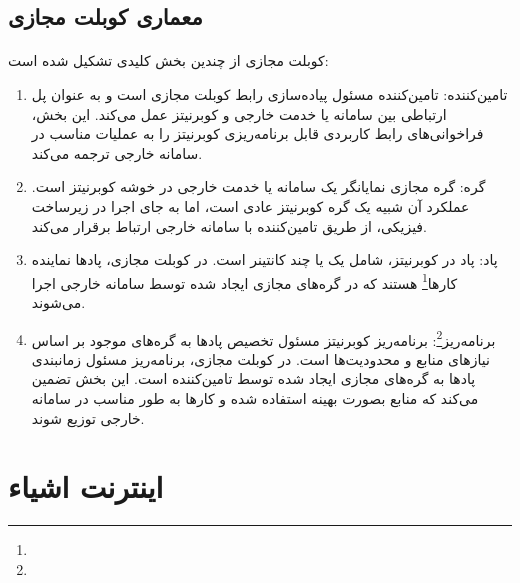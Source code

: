 \subsection{معماری کوبلت مجازی}
\label{subsec:vkube_arch}
\paragraph{}
{
    کوبلت مجازی از چندین بخش کلیدی تشکیل شده است:
    \begin{enumerate}
        \item تامین‌کننده: تامین‌کننده مسئول پیاده‌سازی رابط کوبلت مجازی است و به عنوان پل ارتباطی بین سامانه یا خدمت خارجی و کوبرنیتز عمل می‌کند. این بخش، فراخوانی‌های رابط کاربردی قابل برنامه‌ریزی کوبرنیتز را به عملیات مناسب در سامانه خارجی ترجمه می‌کند.
        \item گره: گره مجازی نمایانگر یک سامانه یا خدمت خارجی در خوشه کوبرنیتز است. عملکرد آن شبیه یک گره کوبرنیتز عادی است، اما به جای اجرا در زیرساخت فیزیکی، از طریق تامین‌کننده با سامانه خارجی ارتباط برقرار می‌کند.
        \item پاد: پاد در کوبرنیتز، شامل یک یا چند کانتینر است. در کوبلت مجازی، پادها نماینده کارها\footnote{} هستند که در گره‌های مجازی ایجاد شده توسط سامانه خارجی اجرا می‌شوند.
        \item برنامه‌ریز\footnote{}: برنامه‌ریز کوبرنیتز مسئول تخصیص پادها به گره‌های موجود بر اساس نیازهای منابع و محدودیت‌ها است. در کوبلت مجازی، برنامه‌ریز مسئول زمانبندی پادها به گره‌های مجازی ایجاد شده توسط تامین‌کننده است. این بخش تضمین می‌کند که منابع بصورت بهینه استفاده شده و کارها به طور مناسب در سامانه خارجی توزیع شوند.
    \end{enumerate}
}

\section{اینترنت اشیاء}
\label{sec:iot}
